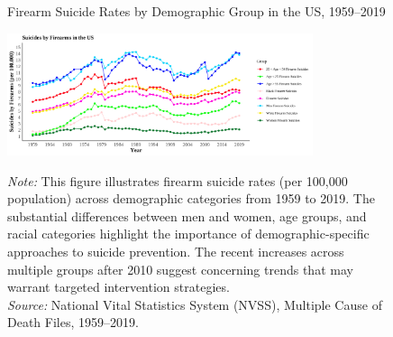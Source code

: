 \pagebreak
\clearpage

\begin{figure}[htbp]
    \centering
    \caption{Firearm Suicide Rates by Demographic Group in the US, 1959–2019}
    \includegraphics[width=0.8\textwidth]{figures/221-suicide_firearm_byyear_raceagesex.png}
    \label{fig:221-suicide_firearm_byyear_raceagesex}

    \begin{minipage}{\linewidth}
    \caption*{\footnotesize{
      \noindent\textit{Note:} This figure illustrates firearm suicide rates (per 100,000 population) across demographic categories from 1959 to 2019. The substantial differences between men and women, age groups, and racial categories highlight the importance of demographic-specific approaches to suicide prevention. The recent increases across multiple groups after 2010 suggest concerning trends that may warrant targeted intervention strategies.\\
    \noindent\textit{Source:} National Vital Statistics System (NVSS), Multiple Cause of Death Files, 1959–2019.
    }}
  \end{minipage}
\end{figure}
\pagebreak
\clearpage

